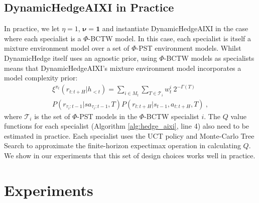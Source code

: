 \documentclass[letterpaper]{article} %
\theoremstyle{definition}
\begin{document}
\subsection{DynamicHedgeAIXI in Practice} 
In practice, we let $\eta = 1$, $\bm{\nu} = \bm{1}$ and instantiate DynamicHedgeAIXI in the case where each specialist is a $\Phi$-BCTW model. In this case, each specialist is itself a mixture environment model over a set of $\Phi$-PST environment models. 
Whilst DynamicHedge itself uses an agnostic prior, using $\Phi$-BCTW models as specialists means that DynamicHedgeAIXI's mixture environment model incorporates a model complexity prior:
\begin{multline}
    \xi^{\pi_t}(r_{t:t+H} | h_{<t}) = \sum_{i \in M_t} \sum_{T \in \mathcal{T}_i} w_{t}^{i} ~ 2^{-\Gamma(T)} \\
    P(r_{\tau_i:t-1} | sa_{\tau_i:t-1}, T) P(r_{t:t+H} | s_{t-1}, a_{t:t+H}, T)~,
\end{multline}
where $\mathcal{T}_i$ is the set of $\Phi$-PST models in the $\Phi$-BCTW specialist $i$.
The $Q$ value functions for each specialist (Algorithm \ref{alg:hedge_aixi}, line 4) also need to be estimated in practice. Each specialist uses the UCT policy \cite{ks06} and Monte-Carlo Tree Search to approximate the finite-horizon expectimax operation in calculating $Q$. 
We show in our experiments that this set of design choices works well in practice.



\section{Experiments}\label{sec:experiments}
\end{document}
